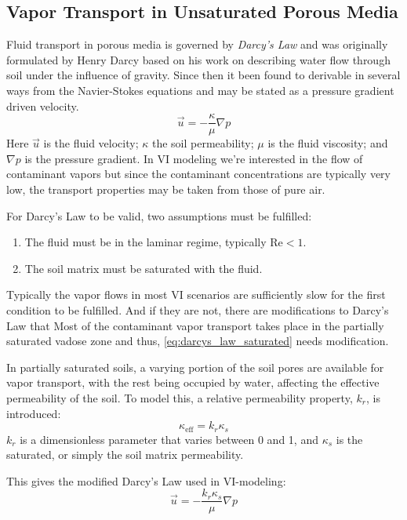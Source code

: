 \subsection{Vapor Transport in Unsaturated Porous Media}\label{sec:darcys}

Fluid transport in porous media is governed by \textit{Darcy's Law} and was originally formulated by Henry Darcy based on his work on describing water flow through soil under the influence of gravity.
Since then it been found to derivable in several ways from the Navier-Stokes equations\cite{bear_dynamics_1972} and may be stated as a pressure gradient driven velocity.
\begin{equation}\label{eq:darcys_law_saturated}
  \vec{u} = -\frac{\kappa}{\mu}\nabla p
\end{equation}
Here $\vec{u}$ is the fluid velocity; $\kappa$ the soil permeability; $\mu$ is the fluid viscosity; and $\nabla p$ is the pressure gradient.
In VI modeling we're interested in the flow of contaminant vapors but since the contaminant concentrations are typically very low, the transport properties may be taken from those of pure air.\par


For Darcy's Law to be valid, two assumptions must be fulfilled:
\begin{enumerate}
  \item The fluid must be in the laminar regime, typically $\mathrm{Re} < 1$.
  \item The soil matrix must be saturated with the fluid.
\end{enumerate}
Typically the vapor flows in most VI scenarios are sufficiently slow for the first condition to be fulfilled.
And if they are not, there are modifications to Darcy's Law that
Most of the contaminant vapor transport takes place in the partially saturated vadose zone and thus, \eqref{eq:darcys_law_saturated} needs modification.

In partially saturated soils, a varying portion of the soil pores are available for vapor transport, with the rest being occupied by water, affecting the effective permeability of the soil.
To model this, a relative permeability property, $k_r$, is introduced:
\begin{equation}
  \kappa_\mathrm{eff} = k_r \kappa_s
\end{equation}
$k_r$ is a dimensionless parameter that varies between 0 and 1, and $\kappa_s$ is the saturated, or simply the soil matrix permeability.

This gives the modified Darcy's Law used in VI-modeling:
\begin{equation}\label{eq:darcys_law}
  \vec{u} = -\frac{k_r \kappa_s}{\mu}\nabla p
\end{equation}
